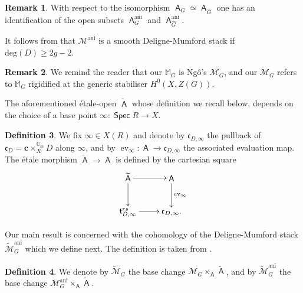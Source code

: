 \documentclass{article}
\DeclareMathOperator{\ev}{ev}
\DeclareMathOperator{\A}{\mathsf{A}}
\DeclareMathOperator{\ani}{ani}
\DeclareMathOperator{\G}{\mathbb{G}}
\newcommand{\Mc}{\mathcal{M}}
\DeclareMathOperator{\Spec}{\mathsf{Spec}}
\theoremstyle{definition}
\newtheorem{definition}{Definition}[section]
\newtheorem{rmk}[definition]{Remark}
\theoremstyle{plain}
\begin{document}
\begin{rmk}\label{rmk:ani}
With respect to the isomorphism $\A_G \simeq \A_{\widehat{G}}$ one has an identification of the open subsets $\A^{\ani}_G$ and $\A^{\ani}_{\widehat{G}}$.
\end{rmk}

It follows from \cite[Proposition 4.14.1]{MR2653248} that $\Mc^{\ani}$ is a smooth Deligne-Mumford stack if $\text{deg}(D) \geq 2g-2$.

\begin{rmk}
We remind the reader that our $\mathbb{M}_G$ is Ng\^o's $\Mc_G$, and our $\Mc_G$ refers to $\mathbb{M}_G$ rigidified at the generic stabiliser $H^0(X,Z(G))$.
\end{rmk}

The aforementioned \'etale-open $\widetilde{\A}$ whose definition we recall below, depends on the choice of a base point $\infty\colon \Spec R \to X$.

\begin{definition}\label{defi:tilde}
We fix $\infty \in X(R)$ and denote by $\mathfrak{c}_{D,\infty}$ the pullback of $\mathfrak{c}_D=\mathbf{c} \times^{\G_m}_X D$ along $\infty$, and by $\ev_{\infty}\colon \A \to \mathfrak{c}_{D,\infty}$ the associated evaluation map. The \'etale morphism $\widetilde{\A} \to \A$ is defined by the cartesian square
\[
\xymatrix{
\widetilde{\A} \ar[r] \ar[d] & \A \ar[d]^{\ev_{\infty}} \\
\mathfrak{t}_{D,\infty}^{rs}\ar[r] & \mathfrak{c}_{D,\infty}.
}
\]
\end{definition}

Our main result is concerned with the cohomology of the Deligne-Mumford stack $\widetilde{\Mc}_G^{\ani}$ which we define next. The definition is taken from \cite[5.3.1]{MR2653248}.

\begin{definition} \label{TildeDef}
We denote by $\widetilde{\Mc}_G$ the base change $\Mc_G \times_{\A} \widetilde{\A}$, and by $\widetilde{\Mc}_G^{\ani}$ the base change $\Mc_G^{\ani} \times_{\A} \widetilde{\A}$.
\end{definition}
\end{document}
